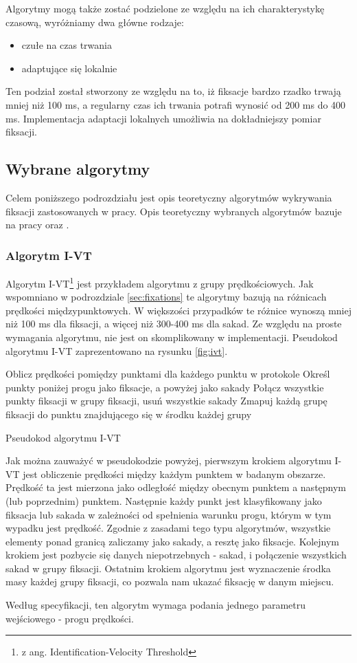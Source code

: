 Algorytmy mogą także zostać podzielone ze względu na ich charakterystykę czasową, wyróżniamy dwa główne rodzaje:
\begin{itemize}
    \item czułe na czas trwania
    \item adaptujące się lokalnie
\end{itemize}
Ten podział został stworzony ze względu na to, iż fiksacje bardzo rzadko trwają mniej niż 100 ms, a regularny czas ich trwania potrafi wynosić od 200 ms do 400 ms. Implementacja adaptacji lokalnych umożliwia na dokładniejszy pomiar fiksacji.
\subsection{Wybrane algorytmy}
Celem poniższego podrozdziału jest opis teoretyczny algorytmów wykrywania fiksacji zastosowanych w pracy. Opis teoretyczny wybranych algorytmów bazuje na pracy \cite{Main} oraz \cite{EvaluationMethodology}.
\subsubsection{Algorytm I-VT}
\label{ssec:ivt}
Algorytm I-VT\footnote{z ang. Identification-Velocity Threshold} jest przykładem algorytmu z grupy prędkościowych. Jak wspomniano w podrozdziale \ref{sec:fixations} te algorytmy bazują na różnicach prędkości międzypunktowych. W większości przypadków te różnice wynoszą mniej niż 100 ms dla fiksacji, a więcej niż 300-400 ms dla sakad. Ze względu na proste wymagania algorytmu, nie jest on skomplikowany w implementacji. Pseudokod algorytmu I-VT zaprezentowano na rysunku \ref{fig:ivt}.
{
\begin{algorithm}[H]
    \SetAlgoLined
    Oblicz prędkości pomiędzy punktami dla każdego punktu w protokole\;
    Określ punkty poniżej progu jako fiksacje, a powyżej jako sakady\;
    Połącz wszystkie punkty fiksacji w grupy fiksacji, usuń wszystkie sakady\;
    Zmapuj każdą grupę fiksacji do punktu znajdującego się w środku każdej grupy\;
    \;
    \label{fig:ivt}
    \caption{Pseudokod algorytmu I-VT}
\end{algorithm}}
Jak można zauważyć w pseudokodzie powyżej, pierwszym krokiem algorytmu I-VT jest obliczenie prędkości między każdym punktem w badanym obszarze. Prędkość ta jest mierzona jako odległość między obecnym punktem a następnym (lub poprzednim) punktem. Następnie każdy punkt jest klasyfikowany jako fiksacja lub sakada w zależności od spełnienia warunku progu, którym w tym wypadku jest prędkość. Zgodnie z zasadami tego typu algorytmów, wszystkie elementy ponad granicą zaliczamy jako sakady, a resztę jako fiksacje. Kolejnym krokiem jest pozbycie się danych niepotrzebnych - sakad, i połączenie wszystkich sakad w grupy fiksacji. Ostatnim krokiem algorytmu jest wyznaczenie środka masy każdej grupy fiksacji, co pozwala nam ukazać fiksację w danym miejscu.\par
Według specyfikacji, ten algorytm wymaga podania jednego parametru wejściowego - progu prędkości.
